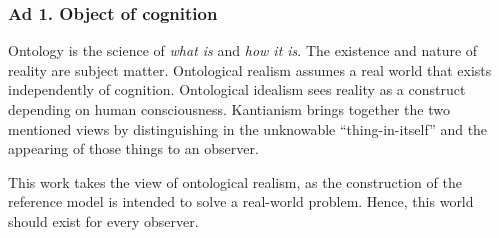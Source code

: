 %

\subsubsection{Ad 1. Object of cognition}
Ontology is the science of \textit{what is} and \textit{how it is}. The existence and nature of reality are subject matter. Ontological realism assumes a real world that exists independently of cognition. Ontological idealism sees reality as a construct depending on human consciousness. Kantianism brings together the two mentioned views by distinguishing in the unknowable \enquote{thing-in-itself} and the appearing of those things to an observer. 

This work takes the view of ontological realism, as the construction of the reference model is intended to solve a real-world problem. Hence, this world should exist for every observer. 


